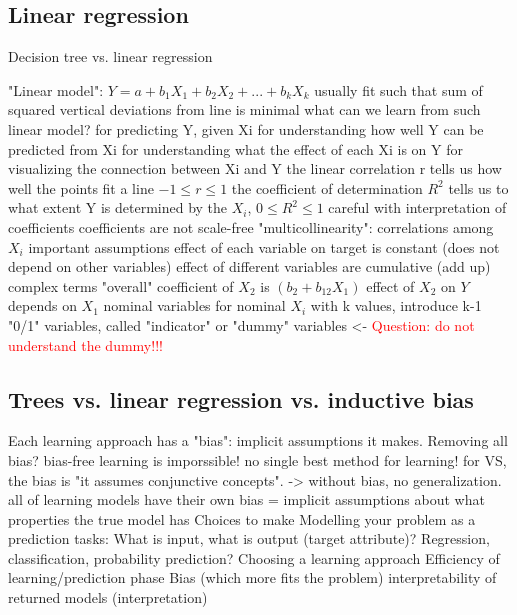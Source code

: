 \subsection{Linear regression}
Decision tree vs. linear regression
\begin{outline}
    \1 "Linear model": $Y = a + b_{1}X_{1} + b_{2}X_{2} + ... + b_{k}X_{k}$
        \2 usually fit such that sum of squared vertical deviations from line is minimal
        \2 what can we learn from such linear model?
            \3 for predicting Y, given Xi
            \3 for understanding how well Y can be predicted from Xi
            \3 for understanding what the effect of each Xi is on Y
            \3 for visualizing the connection between Xi and Y
            \3 the linear correlation r tells us how well the points fit a line $-1 \le r \le 1$
            \3 the coefficient of determination $R^{2}$ tells us to what extent Y is determined by the $X_{i}$, $0 \le R^{2} \le 1$
        \2 careful with interpretation of coefficients
            \3 coefficients are not scale-free
            \3 "multicollinearity": correlations among $X_{i}$
    \1 important assumptions
        \2 effect of each variable on target is constant (does not depend on other variables)
        \2 effect of different variables are cumulative (add up)
    \1 complex terms
        \2 "overall" coefficient of $X_{2}$ is $(b_{2} + b_{12}X_{1})$ effect of $X_{2}$ on $Y$ depends on $X_{1}$
    \1 nominal variables
        \2 for nominal $X_{i}$ with k values, introduce k-1 "0/1" variables, called "indicator" or "dummy" variables <- \textcolor{red}{Question: do not understand the dummy!!!}
\end{outline}

\subsection{Trees vs. linear regression vs. inductive bias}
\begin{outline}
    \1 Each learning approach has a "bias": implicit assumptions it makes.
    \1 Removing all bias?
        \2 bias-free learning is imporssible!
        \2 no single best method for learning!
        \2 for VS, the bias is "it assumes conjunctive concepts". -> without bias, no generalization.
        \2 all of learning models have their own bias = implicit assumptions about what properties the true model has    
    \1 Choices to make
        \2 Modelling your problem as a prediction tasks:
            \3 What is input, what is output (target attribute)?
            \3 Regression, classification, probability prediction?
        \2 Choosing a learning approach
            \3 Efficiency of learning/prediction phase
            \3 Bias (which more fits the problem)
            \3 interpretability of returned models (interpretation)
\end{outline}

